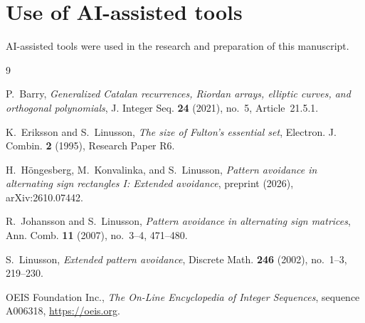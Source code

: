 \documentclass{amsart}
\theoremstyle{definition}
\theoremstyle{remark}
\numberwithin{equation}{section}
\begin{document}
\section*{Use of AI-assisted tools}

AI-assisted tools were used in the research and preparation of this manuscript.

\begin{thebibliography}{9}

P.~Barry, \emph{Generalized Catalan recurrences, Riordan arrays, elliptic curves, and orthogonal polynomials}, J. Integer Seq. \textbf{24} (2021), no.~5, Article~21.5.1.

K.~Eriksson and S.~Linusson, \emph{The size of Fulton's essential set}, Electron. J. Combin. \textbf{2} (1995), Research Paper R6.

H.~H\"ongesberg, M.~Konvalinka, and S.~Linusson, \emph{Pattern avoidance in alternating sign rectangles I: Extended avoidance}, preprint (2026), arXiv:2610.07442.

R.~Johansson and S.~Linusson, \emph{Pattern avoidance in alternating sign matrices}, Ann. Comb. \textbf{11} (2007), no.~3--4, 471--480.

S.~Linusson, \emph{Extended pattern avoidance}, Discrete Math. \textbf{246} (2002), no.~1--3, 219--230.

OEIS Foundation Inc., \emph{The On-Line Encyclopedia of Integer Sequences}, sequence A006318, \url{https://oeis.org}.

\end{thebibliography}
\end{document}
